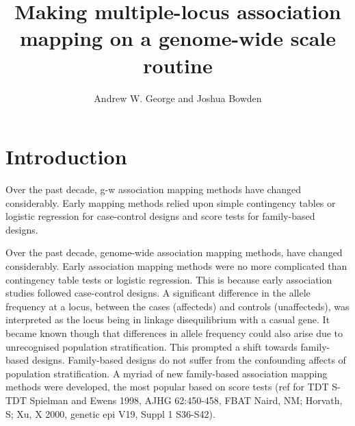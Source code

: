 \documentclass[12pt]{article}
\begin{document}
\title{Making multiple-locus association mapping on a genome-wide scale routine}
\author{Andrew W. George and Joshua Bowden}

\maketitle




\section{Introduction}

Over the past decade, g-w association mapping methods have changed considerably. Early mapping methods relied upon 
simple contingency tables or logistic regression for case-control designs and score tests for family-based designs. 



Over the past decade, genome-wide association mapping methods, have changed considerably. Early association mapping 
methods were no more complicated than contingency table tests or logistic regression. This is because early association 
studies followed case-control designs. A significant difference in the allele frequency at a locus, between the cases (affecteds) and 
controls (unaffecteds), was interpreted as the locus being in linkage disequilibrium with a casual gene. 
It became known though that differences in allele frequency could also arise due to unrecognised population stratification. 
This prompted a shift towards family-based designs. Family-based designs do not suffer from 
the confounding affects of population stratification. A myriad of new family-based association mapping methods were developed, 
the most popular based on score tests (ref for TDT S-TDT Spielman and Ewens 1998, AJHG 62:450-458, FBAT Naird, NM; Horvath, S; Xu, X 2000, genetic epi V19, Suppl 1 S36-S42). 
\end{document}
